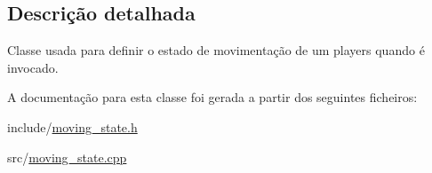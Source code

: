 \subsection{Descrição detalhada}
Classe usada para definir o estado de movimentação de um players quando é invocado. 

A documentação para esta classe foi gerada a partir dos seguintes ficheiros\+:\begin{DoxyCompactItemize}
\item 
include/\mbox{\hyperlink{moving__state_8h}{moving\+\_\+state.\+h}}\item 
src/\mbox{\hyperlink{moving__state_8cpp}{moving\+\_\+state.\+cpp}}\end{DoxyCompactItemize}
